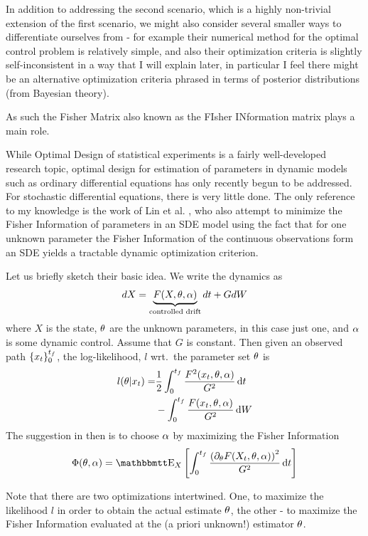 In addition to addressing the second scenario, which is a highly non-trivial
extension of the first scenario, we might also consider several smaller ways to
differentiate ourselves from \cite{Lin} - for example their numerical method for
the optimal control problem is relatively simple, and also their optimization
criteria is slightly self-inconsistent in a way that I will explain later, in
particular I feel there might be an alternative optimization criteria phrased
in terms of posterior distributions (from Bayesian theory).


 

As such the Fisher Matrix also known as the FIsher INformation matrix
plays a main role. 

While Optimal Design of statistical experiments is a fairly well-developed
research topic, optimal design for estimation of parameters in dynamic models
such as ordinary differential equations has only recently begun to be addressed.
For stochastic differential equations, there is very little done. The only
reference to my knowledge is the work of Lin et al. \cite{Lin}, who also
attempt to minimize the Fisher Information of parameters in an SDE model
using the fact that for one unknown parameter the Fisher Information  of the
continuous observations form an SDE yields a tractable dynamic optimization
criterion.

Let us briefly sketch their basic idea. We write the dynamics as
\begin{equation}
dX = \underbrace{F(X,{ \theta}, \alpha)}_{\textrm{controlled drift}}dt
+ G dW
\end{equation}
where $X$ is the state, ${ \theta}$ are the unknown parameters, in this case just one,
and $\alpha$ is some dynamic control. Assume that $G$ is constant. Then given an
observed path $\{x_t\}_0^{ t_f }$, the log-likelihood, $l$ wrt.\ the parameter set ${ \theta}$ is
\begin{align}
l({ \theta} | x_t) =&  \frac 12 \int_0^{ t_f } \frac{F^2(x_t,{ \theta}, \alpha)}{G^2} \, \mathrm{d} t
\notag
\\
&- \int_0^{ t_f }  \frac{F(x_t,{ \theta}, \alpha)}{G^2} \, \mathrm{d} W
\label{eq:log_likelihood_cts_time}
\end{align}
The suggestion in \cite{Lin} then is to choose $\alpha$ by maximizing the Fisher Information
\begin{equation}
\FI(\th, \a) = \Exp_X \left[ \int_0^\tf \frac{ \left( \di_\th F(X_t,\th, \a)
\right)^2}{G^2}
\intd{t}
\right]
\label{eq:Fisher_Information}
\end{equation}

Note that there are two optimizations intertwined. One, to maximize
the likelihood $l$ in order to obtain the actual estimate ${ \theta}$, the other - to
maximize the Fisher Information evaluated at the (a priori unknown!) estimator ${ \theta}$.

